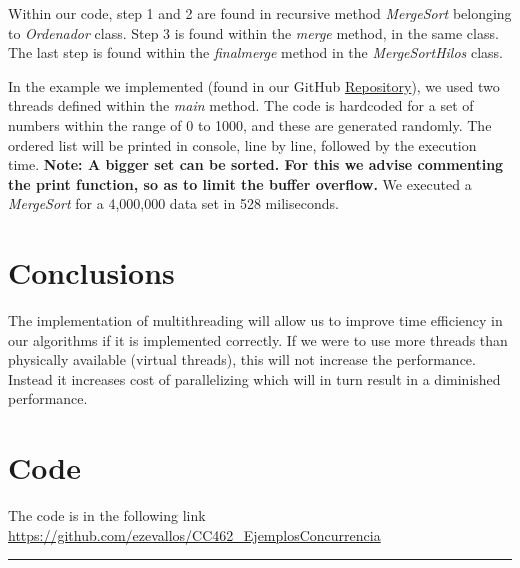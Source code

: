 \documentclass[10pt,a4paper]{article}
\theoremstyle{definition}
\begin{document}
Within our code, step 1 and 2 are found in recursive method \emph{MergeSort} belonging to \emph{Ordenador} class. Step 3 is found within the \emph{merge} method, in the same class. The last step is found within the \emph{finalmerge} method in the \emph{MergeSortHilos} class.

In the example we implemented (found in our GitHub \href{https://github.com/ezevallos/CC462_EjemplosConcurrencia}{Repository}), we used two threads defined within the \emph{main} method. The code is hardcoded for a set of numbers within the range of 0 to 1000, and these are generated randomly. The ordered list will be printed in console, line by line, followed by the execution time. \textbf{Note: A bigger set can be sorted. For this we advise commenting the print function, so as to limit the buffer overflow.} We executed a \emph{MergeSort} for a 4,000,000 data set in 528 miliseconds. 

\section{Conclusions}
The implementation of multithreading will allow us to improve time efficiency in our algorithms if it is implemented correctly. If we were to use more threads than physically available (virtual threads), this will not increase
the performance. Instead it increases cost of parallelizing which will in turn result in a diminished performance.
\section{Code}
The code is in the following link \url{https://github.com/ezevallos/CC462_EjemplosConcurrencia}



\vspace{20pt}
\hrule
\vspace{10pt}

\nocite{*}
%



\end{document}

